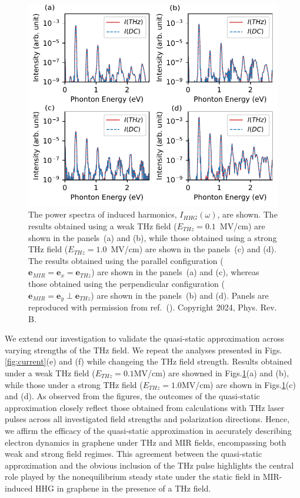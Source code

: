 \begin{figure}[tb]
	\includegraphics[width=0.9\linewidth]{pic/SI_hhg.pdf}
	\caption{\label{fig:quasi-static}
		The power spectra of induced harmonics, $I_{HHG}(\omega)$, are shown. The results obtained using a weak THz field ($E_{THz}=0.1$~MV/cm) are shown in the panels~(a) and (b), while those obtained using a strong THz field ($E_{THz}=1.0$~MV/cm) are shown in the panels~(c) and (d). The results obtained using the parallel configuration ($\mathbf e_{MIR}=\mathbf e_x = \mathbf e_{THz}$) are shown in the panels~(a) and (c), whereas those obtained using the perpendicular configuration ($\mathbf e_{MIR}=\mathbf e_y \perp \mathbf e_{THz}$) are shown in the panels~(b) and (d). Panels are reproduced with permission from ref.~(\cite{PhysRevB.109.045421}). Copyright 2024, Phys. Rev. B.
	}
\end{figure}

We extend our investigation to validate the quasi-static approximation across varying strengths of the THz field. We repeat the analyses presented in Figs.\ref{fig:current}(e) and (f) while changeing the THz field strength. Results obtained under a weak THz field ($E_{THz}=0.1$MV/cm) are showned in Figs.\ref{fig:quasi-static}(a) and (b), while those under a strong THz field ($E_{THz}=1.0$MV/cm) are shown in Figs.\ref{fig:quasi-static}(c) and (d). As observed from the figures, the outcomes of the quasi-static approximation closely reflect those obtained from calculations with THz laser pulses across all investigated field strengths and polarization directions. Hence, we affirm the efficacy of the quasi-static approximation in accurately describing electron dynamics in graphene under THz and MIR fields, encompassing both weak and strong field regimes.
This agreement between the quasi-static approximation and the obvious inclusion of the THz pulse highlights the central role played by the nonequilibrium steady state under the static field in MIR-induced HHG in graphene in the presence of a THz field.
